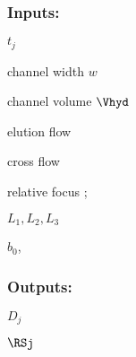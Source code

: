 \subsubsection*{Inputs:}
\vspace*{-4ex}
\label{sec:CalibVhyd}
\begin{multicols}{3}
  \begin{packed_item}
    \item $t_j$
    \item channel width $w$
    \item channel volume $\Vhyd$
    \item elution flow \Ve
    \item cross flow \Vc
    \item relative focus \zP;
    \item $L_1, L_2, L_3$
    \item $b_0$, \bL
  \end{packed_item}
\end{multicols}\vspace*{-4ex}
\subsubsection*{Outputs:}\vspace*{-4ex}
\begin{multicols}{3}
  \begin{packed_item}
  \item  $D_{j}$
  \item $\RSj$
  \end{packed_item}
\end{multicols}
\vspace*{-4ex}
